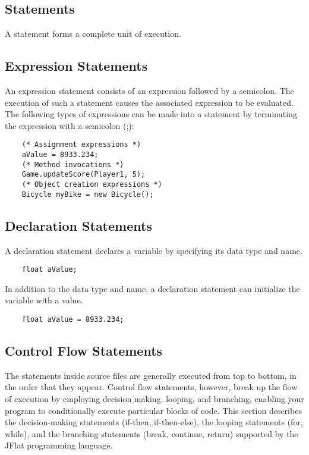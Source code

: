 \begin{homeworkProblem}
	\chapter{Statements}
	A statement forms a complete unit of execution. 

	\section{Expression Statements}
	An expression statement consists of an expression followed by a semicolon. The execution of such a statement causes the associated expression to be evaluated. The following types of expressions can be made into a statement by terminating the expression with a semicolon (;):
	\begin{verbatim}
	(* Assignment expressions *)
	aValue = 8933.234;
	(* Method invocations *)
	Game.updateScore(Player1, 5);
	(* Object creation expressions *)
	Bicycle myBike = new Bicycle();
	\end{verbatim}
	
	\section{Declaration Statements}
	A declaration statement declares a variable by specifying its data type and name.
	\begin{verbatim}
	float aValue;
	\end{verbatim}

	In addition to the data type and name, a declaration statement can initialize the variable with a value.
	\begin{verbatim} 
	float aValue = 8933.234;
	\end{verbatim}
	
	\section{Control Flow Statements}
	The statements inside source files are generally executed from top to bottom, in the order that they appear. Control flow statements, however, break up the flow of execution by employing decision making, looping, and branching, enabling your program to conditionally execute particular blocks of code. This section describes the decision-making statements (if-then, if-then-else), the looping statements (for, while), and the branching statements (break, continue, return) supported by the JFlat programming language.


\end{homeworkProblem}
